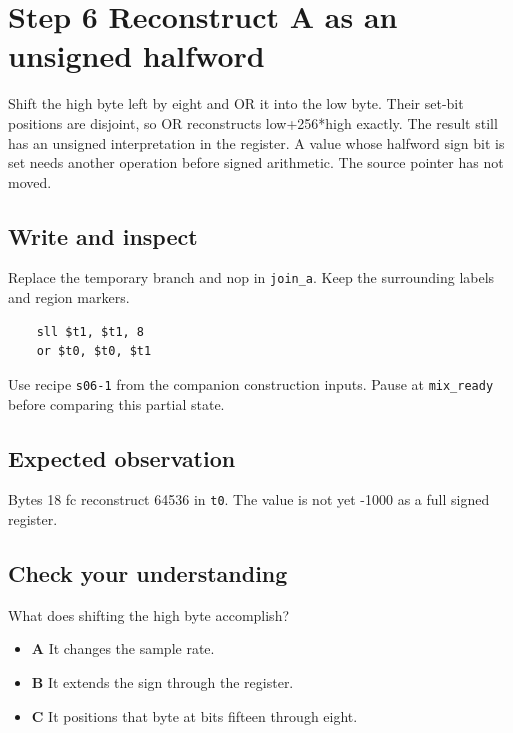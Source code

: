 \section{Step 6 Reconstruct A as an unsigned halfword}\label{pcm-s06}

Shift the high byte left by eight and OR it into the low byte. Their set-bit positions are disjoint, so OR reconstructs low+256*high exactly. The result still has an unsigned interpretation in the register. A value whose halfword sign bit is set needs another operation before signed arithmetic. The source pointer has not moved.

\subsection{Write and inspect}
Replace the temporary branch and nop in \texttt{join\_a}. Keep the surrounding labels and region markers.

\begin{verbatim}
    sll $t1, $t1, 8
    or $t0, $t0, $t1
\end{verbatim}
Use recipe \texttt{s06-1} from the companion construction inputs. Pause at \texttt{mix\_ready} before comparing this partial state.

\subsection{Expected observation}
Bytes 18 fc reconstruct 64536 in \texttt{t0}. The value is not yet -1000 as a full signed register.

\subsection{Check your understanding}
What does shifting the high byte accomplish?

\begin{itemize}
\item \textbf{A} It changes the sample rate.
\item \textbf{B} It extends the sign through the register.
\item \textbf{C} It positions that byte at bits fifteen through eight.
\end{itemize}
